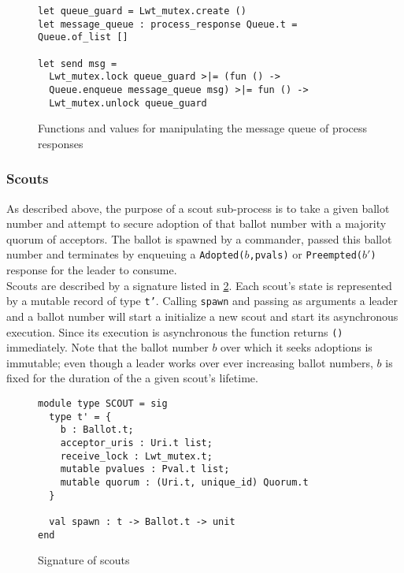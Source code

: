 \begin{figure}
  \begin{lstlisting}
let queue_guard = Lwt_mutex.create ()
let message_queue : process_response Queue.t = Queue.of_list []

let send msg = 
  Lwt_mutex.lock queue_guard >|= (fun () ->
  Queue.enqueue message_queue msg) >|= fun () ->
  Lwt_mutex.unlock queue_guard
  \end{lstlisting}
  \caption{Functions and values for manipulating the message queue of process responses}
  \label{fig:sub-process-messaging-queue}
\end{figure}

\subsubsection{Scouts}

As described above, the purpose of a scout sub-process is to take a given ballot number and attempt to secure adoption of that ballot number with a majority quorum of acceptors. The ballot is spawned by a commander, passed this ballot number and terminates by enqueuing a \texttt{Adopted($b$,pvals)} or \texttt{Preempted($b'$)} response for the leader to consume. \\

Scouts are described by a signature listed in \ref{fig:scout-sig}. Each scout's state is represented by a mutable record of type \texttt{t'}. Calling \texttt{spawn} and passing as arguments a leader and a ballot number will start a initialize a new scout and start its asynchronous execution. Since its execution is asynchronous the function returns \texttt{()} immediately. Note that the ballot number $b$ over which it seeks adoptions is immutable; even though a leader works over ever increasing ballot numbers, $b$ is fixed for the duration of the a given scout's lifetime.  \\

\begin{figure}
  \begin{lstlisting}
module type SCOUT = sig
  type t' = {
    b : Ballot.t;
    acceptor_uris : Uri.t list;
    receive_lock : Lwt_mutex.t;  
    mutable pvalues : Pval.t list;
    mutable quorum : (Uri.t, unique_id) Quorum.t
  }

  val spawn : t -> Ballot.t -> unit
end
  \end{lstlisting}
  \centering
  \caption{Signature of scouts}
  \label{fig:scout-sig}
\end{figure}

